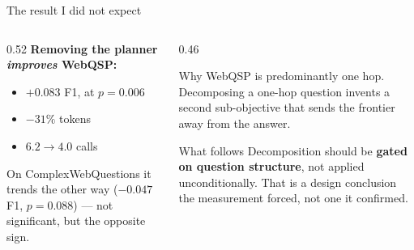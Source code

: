 \documentclass[aspectratio=169,12pt]{beamer}
\begin{document}
\begin{frame}{The result I did not expect}
  \begin{columns}[T]
    \begin{column}{0.52\textwidth}
      \textbf{Removing the planner \emph{improves} WebQSP:}
      \begin{itemize}
        \item $+0.083$ F1, at $p = 0.006$
        \item $-31\%$ tokens
        \item $6.2 \rightarrow 4.0$ calls
      \end{itemize}
      \vspace{2mm}
      \small
      On ComplexWebQuestions it trends the other way ($-0.047$ F1,
      $p = 0.088$) --- not significant, but the opposite sign.
    \end{column}
    \begin{column}{0.46\textwidth}
      \begin{block}{Why}
        \small
        WebQSP is predominantly one hop. Decomposing a one-hop question
        invents a second sub-objective that sends the frontier away from the
        answer.
      \end{block}
      \vspace{1mm}
      \begin{block}{What follows}
        \small
        Decomposition should be \textbf{gated on question structure}, not
        applied unconditionally. That is a design conclusion the measurement
        forced, not one it confirmed.
      \end{block}
    \end{column}
  \end{columns}
\end{frame}
\end{document}
